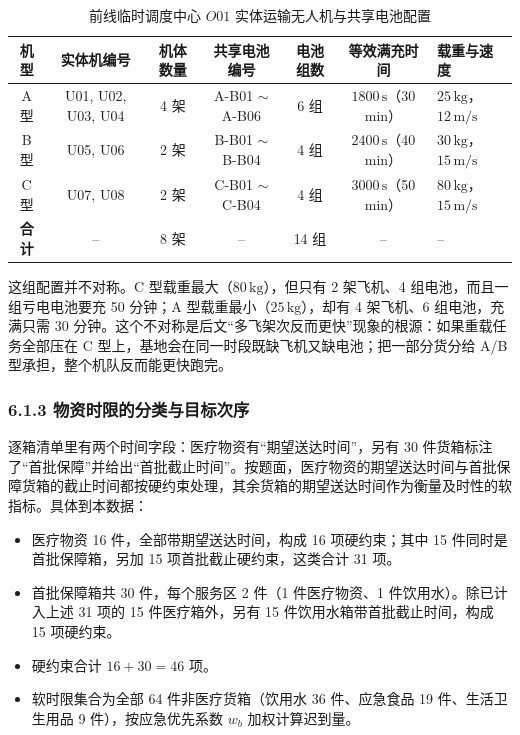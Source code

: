 \documentclass[withoutpreface,bwprint]{format}
\begin{document}
\begin{table}[H]
\centering
\small
\caption{前线临时调度中心 $O01$ 实体运输无人机与共享电池配置}
\label{tab:resources_inventory}
\begin{tabularx}{\textwidth}{c c c c c c >{\raggedright\arraybackslash}X}
\toprule
\textbf{机型} & \textbf{实体机编号} & \textbf{机体数量} & \textbf{共享电池编号} & \textbf{电池组数} & \textbf{等效满充时间} & \textbf{载重与速度} \\
\midrule
A 型 & U01, U02, U03, U04 & 4 架 & A-B01 $\sim$ A-B06 & 6 组 & $1800\,\text{s}$（30 min） & $25\,\text{kg}$，$12\,\text{m/s}$ \\
B 型 & U05, U06 & 2 架 & B-B01 $\sim$ B-B04 & 4 组 & $2400\,\text{s}$（40 min） & $30\,\text{kg}$，$15\,\text{m/s}$ \\
C 型 & U07, U08 & 2 架 & C-B01 $\sim$ C-B04 & 4 组 & $3000\,\text{s}$（50 min） & $80\,\text{kg}$，$15\,\text{m/s}$ \\
\midrule
\textbf{合计} & -- & 8 架 & -- & 14 组 & -- & -- \\
\bottomrule
\end{tabularx}
\end{table}

这组配置并不对称。C 型载重最大（$80\,\text{kg}$），但只有 2 架飞机、4 组电池，而且一组亏电电池要充 50 分钟；A 型载重最小（$25\,\text{kg}$），却有 4 架飞机、6 组电池，充满只需 30 分钟。这个不对称是后文“多飞架次反而更快”现象的根源：如果重载任务全部压在 C 型上，基地会在同一时段既缺飞机又缺电池；把一部分货分给 A/B 型承担，整个机队反而能更快跑完。

\subsubsection{6.1.3 物资时限的分类与目标次序}
逐箱清单里有两个时间字段：医疗物资有“期望送达时间”，另有 30 件货箱标注了“首批保障”并给出“首批截止时间”。按题面，医疗物资的期望送达时间与首批保障货箱的截止时间都按硬约束处理，其余货箱的期望送达时间作为衡量及时性的软指标。具体到本数据：

\begin{itemize}[leftmargin=*]
    \item 医疗物资 16 件，全部带期望送达时间，构成 16 项硬约束；其中 15 件同时是首批保障箱，另加 15 项首批截止硬约束，这类合计 31 项。
    \item 首批保障箱共 30 件，每个服务区 2 件（1 件医疗物资、1 件饮用水）。除已计入上述 31 项的 15 件医疗箱外，另有 15 件饮用水箱带首批截止时间，构成 15 项硬约束。
    \item 硬约束合计 $16+30=46$ 项。
    \item 软时限集合为全部 64 件非医疗货箱（饮用水 36 件、应急食品 19 件、生活卫生用品 9 件），按应急优先系数 $w_b$ 加权计算迟到量。
\end{itemize}
\end{document}
